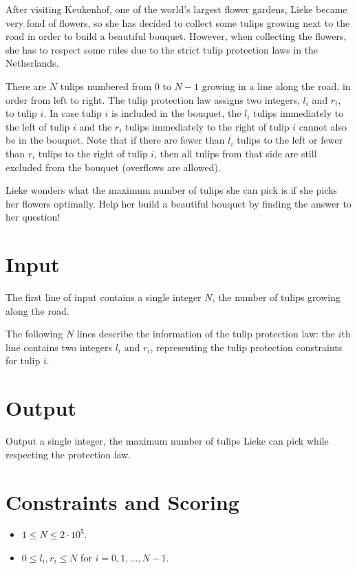 
After visiting Keukenhof, one of the world's largest flower gardens, Lieke became very fond of flowers, so she has decided to collect some tulips growing next to the road in order to build a beautiful bouquet. However, when collecting the flowers, she has to respect some rules due to the strict tulip protection laws in the Netherlands.

There are $N$ tulips numbered from $0$ to $N-1$ growing in a line along the road, in order from left to right. The tulip protection law assigns two integers, $l_i$ and $r_i$, to tulip $i$. In case tulip $i$ is included in the bouquet, the $l_i$ tulips immediately to the left of tulip $i$ and the $r_i$ tulips immediately to the right of tulip $i$ cannot also be in the bouquet. Note that if there are fewer than $l_i$ tulips to the left or fewer than $r_i$ tulips to the right of tulip $i$, then all tulips from that side are still excluded from the bouquet (overflows are allowed).

Lieke wonders what the maximum number of tulips she can pick is if she picks her flowers optimally. Help her build a beautiful bouquet by finding the answer to her question!

\section*{Input}
The first line of input contains a single integer $N$, the number of tulips growing along the road.

The following $N$ lines describe the information of the tulip protection law: the $i$th line contains two integers $l_i$ and $r_i$, representing the tulip protection constraints for tulip $i$.

\section*{Output}
Output a single integer, the maximum number of tulips Lieke can pick while respecting the protection law.

\section*{Constraints and Scoring}
\begin{itemize}
\item $1 \leq N \leq 2 \cdot 10^5$.
\item $0 \leq l_i, r_i \leq N$ for $i = 0,1,\ldots, N-1$.
\end{itemize}


